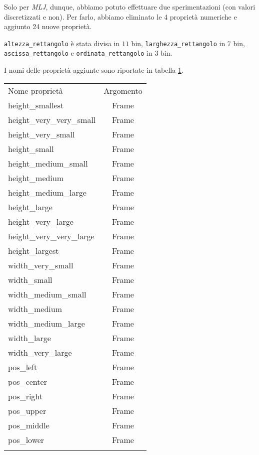 Solo per \emph{MLJ}, dunque, abbiamo potuto effettuare due sperimentazioni (con valori discretizzati e non). Per farlo, abbiamo eliminato le 4 proprietà numeriche e aggiunto 24 nuove proprietà.

\verb+altezza_rettangolo+ è stata divisa in $11$ bin, \verb+larghezza_rettangolo+ in $7$ bin, \verb+ascissa_rettangolo+ e \verb+ordinata_rettangolo+ in $3$ bin.

I nomi delle proprietà aggiunte sono riportate in tabella \ref{tab:discretizzazione}.

\begin{table}[htbp]
\centering
\label{tab:discretizzazione}
\small\begin{tabular}{lc}
\toprule
\addlinespace
Nome proprietà & Argomento \\
\addlinespace
\midrule
\addlinespace
height\_smallest & Frame \\ 
height\_very\_very\_small & Frame \\ 
height\_very\_small & Frame \\ 
height\_small & Frame \\ 
height\_medium\_small & Frame \\ 
height\_medium & Frame \\ 
height\_medium\_large & Frame \\ 
height\_large & Frame \\ 
height\_very\_large & Frame \\ 
height\_very\_very\_large & Frame \\ 
height\_largest & Frame \\ 
\midrule
width\_very\_small & Frame \\ 
width\_small & Frame \\ 
width\_medium\_small & Frame \\ 
width\_medium & Frame \\ 
width\_medium\_large & Frame \\ 
width\_large & Frame \\ 
width\_very\_large & Frame \\ 
\midrule
pos\_left & Frame \\ 
pos\_center & Frame \\ 
pos\_right & Frame \\
\midrule
pos\_upper & Frame \\ 
pos\_middle & Frame \\ 
pos\_lower & Frame \\  
\addlinespace
\bottomrule 
\end{tabular}
\end{table}


